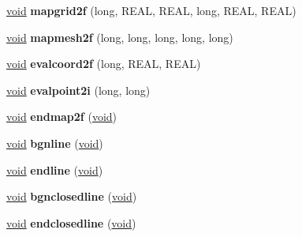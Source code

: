 \begin{DoxyCompactItemize}
\mbox{\label{class_open_g_l_surface_evaluator_acfeca64c26ed98ec169ec21ce7b16678}} 
\hyperlink{interfacevoid}{void} {\bfseries mapgrid2f} (long, R\+E\+AL, R\+E\+AL, long, R\+E\+AL, R\+E\+AL)
\item 
\mbox{\label{class_open_g_l_surface_evaluator_a88102f1997d648429c6f82af97111728}} 
\hyperlink{interfacevoid}{void} {\bfseries mapmesh2f} (long, long, long, long, long)
\item 
\mbox{\label{class_open_g_l_surface_evaluator_a8df24964a66dccfad880a7720edefcf2}} 
\hyperlink{interfacevoid}{void} {\bfseries evalcoord2f} (long, R\+E\+AL, R\+E\+AL)
\item 
\mbox{\label{class_open_g_l_surface_evaluator_a906b7123696b3e0cbe4f74232381ff17}} 
\hyperlink{interfacevoid}{void} {\bfseries evalpoint2i} (long, long)
\item 
\mbox{\label{class_open_g_l_surface_evaluator_a76f577e1c9513395c6ab97549879c834}} 
\hyperlink{interfacevoid}{void} {\bfseries endmap2f} (\hyperlink{interfacevoid}{void})
\item 
\mbox{\label{class_open_g_l_surface_evaluator_ac812fda37d58e482bc35483d0d70158e}} 
\hyperlink{interfacevoid}{void} {\bfseries bgnline} (\hyperlink{interfacevoid}{void})
\item 
\mbox{\label{class_open_g_l_surface_evaluator_a05a4daf2a4e96d7873f4b5d7295685f3}} 
\hyperlink{interfacevoid}{void} {\bfseries endline} (\hyperlink{interfacevoid}{void})
\item 
\mbox{\label{class_open_g_l_surface_evaluator_a660d2ef45a9003a9bd7f0bcb30a31eee}} 
\hyperlink{interfacevoid}{void} {\bfseries bgnclosedline} (\hyperlink{interfacevoid}{void})
\item 
\mbox{\label{class_open_g_l_surface_evaluator_a69b5e87ac1410afe3ef03a4cfb5294fd}} 
\hyperlink{interfacevoid}{void} {\bfseries endclosedline} (\hyperlink{interfacevoid}{void})

\end{DoxyCompactItemize}
